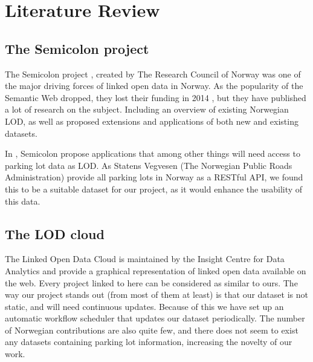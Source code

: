 \chapter{Literature Review}




\section{The Semicolon project}
The Semicolon project \cite{semicolon}, created by The Research Council of Norway was one of the major driving forces of linked open data in Norway. As the popularity of the Semantic Web dropped, they lost their funding in 2014 \cite{semicolon-slutt}, but they have published a lot of research on the subject. Including an overview of existing Norwegian LOD, as well as proposed extensions and applications of both new and existing datasets. 

In \cite{semicolon-ii}, Semicolon propose applications that among other things will need access to parking lot data as LOD. As Statens Vegvesen (The Norwegian Public Roads Administration) provide all parking lots in Norway as a RESTful API, we found this to be a suitable dataset for our project, as it would enhance the usability of this data.


\section{The LOD cloud}
The Linked Open Data Cloud \cite{lod-cloud}  is maintained by the Insight Centre for Data Analytics and provide a graphical representation of linked open data available on the web. Every project linked to here can be considered as similar to ours. The way our project stands out (from most of them at least) is that our dataset is not static, and will need continuous updates. Because of this we have set up an automatic workflow scheduler that updates our dataset periodically. The number of Norwegian contributions are also quite few, and there does not seem to exist any datasets containing parking lot information, increasing the novelty of our work.
